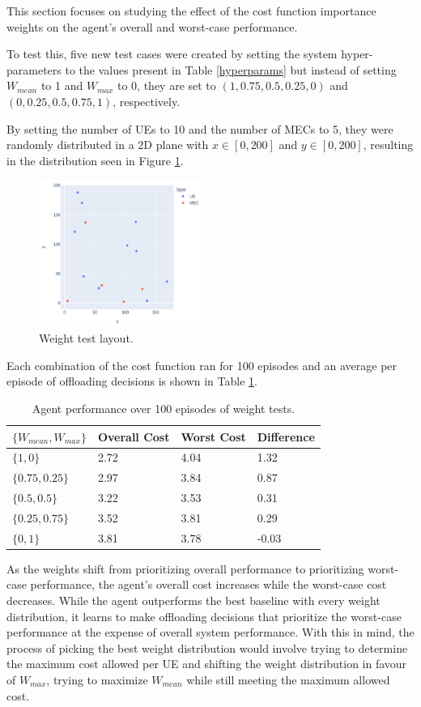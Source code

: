 This section focuses on studying the effect of the cost function importance weights on the agent's overall and worst-case performance.

To test this, five new test cases were created by setting the system hyper-parameters to the values present in Table \ref{hyperparams} but instead of setting $W_{mean}$ to 1 and $W_{max}$ to 0, they are set to $(1, 0.75, 0.5, 0.25, 0)$ and $(0, 0.25, 0.5, 0.75, 1)$, respectively.

By setting the number of \acrshort{UE}s to 10 and the number of \acrshort{MEC}s to 5, they were randomly distributed in a 2D plane with $x \in [0, 200]$ and $y \in [0, 200]$, resulting in the distribution seen in Figure \ref{weight_test}.

\begin{figure}[H]
  \centering
  \includegraphics[width=200px]{images/5_10_layout.png}
  \caption{Weight test layout.}  \label{weight_test}
\end{figure}

Each combination of the cost function ran for 100 episodes and an average per episode of offloading decisions is shown in Table \ref{weight_table}.

\begin{table}[H]
\centering
\begin{tabular}{|l|l|l|l|}
\hline
$\{W_{mean}, W_{max}\}$ & Overall Cost & Worst Cost & Difference \\ \hline
$\{1, 0\}$       & 2.72 & 4.04 & 1.32\\
$\{0.75, 0.25\}$  & 2.97 & 3.84  & 0.87\\
$\{0.5, 0.5\}$ & 3.22 & 3.53 & 0.31\\ 
$\{0.25, 0.75\}$ & 3.52 & 3.81 & 0.29\\ 
$\{0, 1\}$ & 3.81 & 3.78 & -0.03 \\ \hline
\end{tabular}
\caption{Agent performance over 100 episodes of weight tests.} \label{weight_table}
\end{table}

As the weights shift from prioritizing overall performance to prioritizing worst-case performance, the agent's overall cost increases while the worst-case cost decreases. While the agent outperforms the best baseline with every weight distribution, it learns to make offloading decisions that prioritize the worst-case performance at the expense of overall system performance. With this in mind, the process of picking the best weight distribution would involve trying to determine the maximum cost allowed per \acrshort{UE} and shifting the weight distribution in favour of $W_{max}$, trying to maximize $W_{mean}$ while still meeting the maximum allowed cost.
